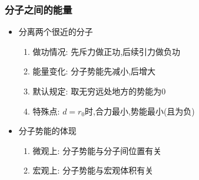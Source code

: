 \documentclass{article}
\begin{document}
\subsubsection{分子之间的能量}
\begin{itemize}
    \item 分离两个很近的分子
          \begin{enumerate}[label = (\arabic*)]
              \item 做功情况: 先斥力做正功,后续引力做负功
              \item 能量变化: 分子势能先减小,后增大
              \item 默认规定: 取无穷远处地方的势能为$0$
              \item 特殊点: $d = r_{0}$时,合力最小,势能最小(且为负)
          \end{enumerate}
    \item 分子势能的体现
          \begin{enumerate}[label = (\arabic*)]
              \item 微观上: 分子势能与分子间位置有关
              \item 宏观上: 分子势能与宏观体积有关
          \end{enumerate}
\end{itemize}

\vspace{2em}
\end{document}
